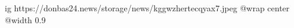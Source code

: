  
 
 
 
 

\ifcmt
  ig https://donbas24.news/storage/news/kggwzhertecqyax7.jpeg
  @wrap center
  @width 0.9
\fi
